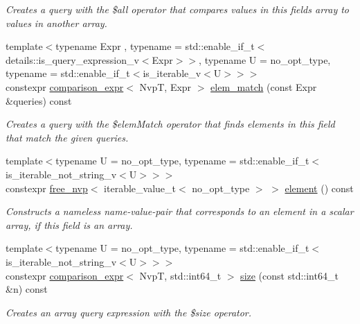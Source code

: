 \begin{DoxyCompactItemize}
\begin{DoxyCompactList}\small\item\em Creates a query with the \$all operator that compares values in this field\textquotesingle{}s array to values in another array. \end{DoxyCompactList}\item 
{\footnotesize template$<$typename Expr , typename  = std\+::enable\+\_\+if\+\_\+t$<$details\+::is\+\_\+query\+\_\+expression\+\_\+v$<$\+Expr$>$$>$, typename U  = no\+\_\+opt\+\_\+type, typename  = std\+::enable\+\_\+if\+\_\+t$<$is\+\_\+iterable\+\_\+v$<$\+U$>$$>$$>$ }\\constexpr \hyperlink{classmongo__odm_1_1comparison__expr}{comparison\+\_\+expr}$<$ NvpT, Expr $>$ \hyperlink{classmongo__odm_1_1nvp__base_a619149367087ce41ec95b52be06ed50e}{elem\+\_\+match} (const Expr \&queries) const 
\begin{DoxyCompactList}\small\item\em Creates a query with the \$elem\+Match operator that finds elements in this field that match the given queries. \end{DoxyCompactList}\item 
{\footnotesize template$<$typename U  = no\+\_\+opt\+\_\+type, typename  = std\+::enable\+\_\+if\+\_\+t$<$is\+\_\+iterable\+\_\+not\+\_\+string\+\_\+v$<$\+U$>$$>$$>$ }\\constexpr \hyperlink{classmongo__odm_1_1free__nvp}{free\+\_\+nvp}$<$ iterable\+\_\+value\+\_\+t$<$ no\+\_\+opt\+\_\+type $>$ $>$ \hyperlink{classmongo__odm_1_1nvp__base_ae279f5bc8267faedd12d9c1f79f6e831}{element} () const 
\begin{DoxyCompactList}\small\item\em Constructs a nameless name-\/value-\/pair that corresponds to an element in a scalar array, if this field is an array. \end{DoxyCompactList}\item 
{\footnotesize template$<$typename U  = no\+\_\+opt\+\_\+type, typename  = std\+::enable\+\_\+if\+\_\+t$<$is\+\_\+iterable\+\_\+not\+\_\+string\+\_\+v$<$\+U$>$$>$$>$ }\\constexpr \hyperlink{classmongo__odm_1_1comparison__expr}{comparison\+\_\+expr}$<$ NvpT, std\+::int64\+\_\+t $>$ \hyperlink{classmongo__odm_1_1nvp__base_a44853122530eb589515d13397ed47dd3}{size} (const std\+::int64\+\_\+t \&n) const 
\begin{DoxyCompactList}\small\item\em Creates an array query expression with the \$size operator. \end{DoxyCompactList}\item 

\end{DoxyCompactItemize}
